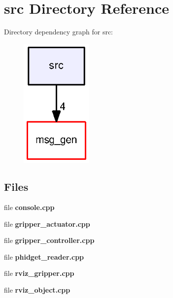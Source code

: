 \section{src Directory Reference}
\label{dir_68267d1309a1af8e8297ef4c3efbcdba}
Directory dependency graph for src\-:\nopagebreak
\begin{figure}[H]
\begin{center}
\leavevmode
\includegraphics[width=100pt]{dir_68267d1309a1af8e8297ef4c3efbcdba_dep}
\end{center}
\end{figure}
\subsection*{Files}
\begin{DoxyCompactItemize}
\item 
file {\bf console.\-cpp}
\item 
file {\bf gripper\-\_\-actuator.\-cpp}
\item 
file {\bf gripper\-\_\-controller.\-cpp}
\item 
file {\bf phidget\-\_\-reader.\-cpp}
\item 
file {\bf rviz\-\_\-gripper.\-cpp}
\item 
file {\bf rviz\-\_\-object.\-cpp}
\end{DoxyCompactItemize}
